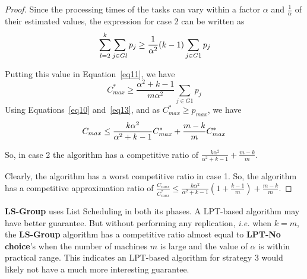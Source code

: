 \documentclass[10pt, conference, compsocconf]{IEEEtran}
\newtheorem{corollary}{Corollary}[theorem]
\begin{document}
\begin{proof}
  Since the processing times of the tasks can vary within a factor
  $\alpha$ and $\frac{1}{\alpha}$ of their estimated values, the
  expression for case 2 can be written as
  \begin{equation}{\nonumber}
    \sum_{l=2}^{k}\sum_{j \in Gl }^{}{ p_{j}} \geq \frac{1}{\alpha^2} (k-1)\sum_{j \in G1 }^{}{ p_{j}}
  \end{equation}
  
  Putting this value in Equation~\ref{eq11}, we have
  \begin{equation}\label{eq13}
    C_{max}^{*} \geq \frac{\alpha^2+k-1}{m\alpha^2}\sum_{j \in G1 }^{}{ p_{j}}
  \end{equation}
  Using Equations~\ref{eq10} and~\ref{eq13}, and as $C_{max}^{*} \geq p_{max}$, we have
  \begin{equation}{\nonumber}
    C_{max} \leq \frac{k\alpha^2}{\alpha^2+k-1}C_{max}^{*}+\frac{m-k}{m}C_{max}^{*}
  \end{equation}
  
  So, in case 2 the algorithm has a competitive ratio of
  $\frac{k\alpha^2}{\alpha^2+k-1}+\frac{m-k}{m}$.

  Clearly, the algorithm has a worst competitive ratio in case 1.  So,
  the algorithm has a competitive approximation ratio of
  $\frac{C_{max}}{C_{max}^{*}} \leq \frac{k\alpha^{2}}{\alpha^{2}+k-1}
  \left( 1+ {\frac{k-1}{m}} \right) + {\frac{m-k}{m}}$.
\end{proof}


\textbf{LS-Group} uses List Scheduling in both its phases. A LPT-based
algorithm may have better guarantee. But without performing any
replication, {\em i.e.} when $k=m$, the \textbf{LS-Group} algorithm
has a competitive ratio almost equal to \textbf{LPT-No choice}'s when
the number of machines $m$ is large and the value of $\alpha$ is
within practical range. This indicates an LPT-based algorithm for
strategy 3 would likely not have a much more interesting guarantee.
\end{document}
